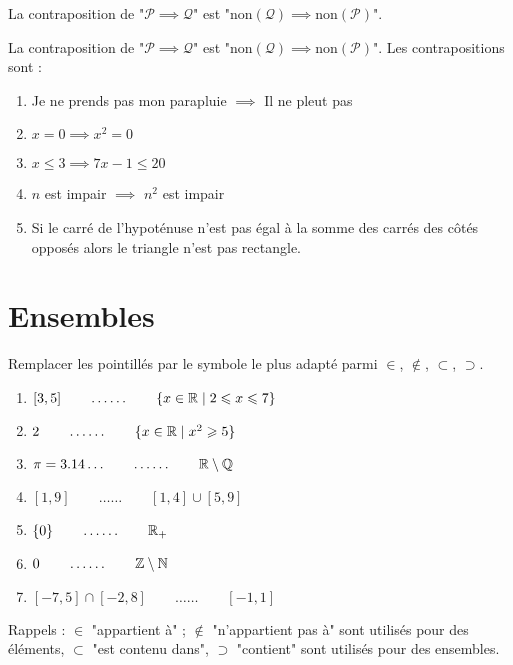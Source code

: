 \documentclass[11pt,class=report,crop=false]{standalone}
\begin{document}
\indication
La contraposition de "$\mathcal{P} \implies \mathcal{Q}$" est
"$\text{non}(\mathcal{Q}) \implies \text{non}(\mathcal{P})$".
\finindication

\correction
La contraposition de "$\mathcal{P} \implies \mathcal{Q}$" est
"$\text{non}(\mathcal{Q}) \implies \text{non}(\mathcal{P})$".
Les contrapositions sont :
\begin{enumerate}
    \item Je ne prends pas mon parapluie $\implies$ Il ne pleut pas
    \item $x = 0\implies x^2 = 0$ 
    \item $x \le 3 \implies 7x-1 \le 20$ 
    \item $n$ est impair $\implies$ $n^2$ est impair
    \item Si le carré de l'hypoténuse n'est pas égal à la somme des carrés des côtés opposés alors le triangle n'est pas rectangle.
\end{enumerate} 
\fincorrection
\finexercice




\section{Ensembles}

\exercice{}
\enonce
Remplacer les pointillés par le symbole le plus adapté parmi $\in$, $\notin$, $\subset$, $\supset$.

\begin{enumerate}
    \item $ [3,5] \qquad \ldots\ldots \qquad \{ x \in \mathbb{R} \mid 2 \leqslant x \leqslant 7 \} $
    \item $ 2 \qquad \ldots\ldots \qquad \{ x \in \mathbb{R} \mid x^2 \geqslant 5 \} $
    \item $\pi = 3.14\dots  \qquad \ldots\ldots \qquad \mathbb{R} \setminus \mathbb{Q} $
    \item $[1,9] \qquad \ldots\ldots \qquad [1,4] \cup [5,9] $
    \item $\{ 0 \} \qquad \ldots\ldots \qquad \mathbb{R}_+$
    \item $0 \qquad \ldots\ldots \qquad \mathbb{Z} \setminus \mathbb{N} $   
    \item $[-7,5] \cap [-2,8] \qquad \ldots\ldots \qquad [-1,1] $  
\end{enumerate}    
\finenonce

\indication
Rappels :
$\in$ "appartient à" ; $\notin$ "n'appartient pas à" sont utilisés pour des éléments, $\subset$ "est contenu dans", $\supset$ "contient" sont utilisés pour des ensembles.
\finindication
\end{document}
